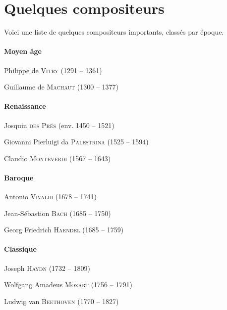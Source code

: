 \documentclass[11pt,a4paper]{scrreprt}
\begin{document}
\chapter{Quelques compositeurs}
Voici une liste de quelques compositeurs importants, classés par époque.

\subsubsection{Moyen âge}
\begin{description}
\item Philippe de \textsc{Vitry} (1291 -- 1361)
\item Guillaume de \textsc{Machaut} (1300 -- 1377)
\end{description}

\subsubsection{Renaissance}
\begin{description}
\item Josquin \textsc{des Prés} (env. 1450 -- 1521)
\item Giovanni Pierluigi da \textsc{Palestrina} (1525 -- 1594)
\item Claudio \textsc{Monteverdi} (1567 -- 1643)
\end{description}

\subsubsection{Baroque}
\begin{description}
\item Antonio \textsc{Vivaldi} (1678 -- 1741)
\item Jean-Sébastion \textsc{Bach} (1685 -- 1750)
\item Georg Friedrich \textsc{Haendel} (1685 -- 1759)
\end{description}

\subsubsection{Classique}
\begin{description}
\item Joseph \textsc{Haydn} (1732 -- 1809)
\item Wolfgang Amadeus \textsc{Mozart} (1756 -- 1791)
\item Ludwig van \textsc{Beethoven} (1770 -- 1827)
\end{description}
\end{document}
